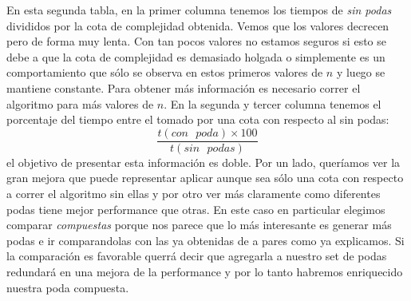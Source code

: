 En esta segunda tabla, en la primer columna tenemos los tiempos de \textit{sin podas} divididos por la cota
de complejidad obtenida. Vemos que los valores decrecen pero de forma muy lenta. Con tan pocos valores
no estamos seguros si esto se debe a que la cota de complejidad es demasiado holgada o simplemente es un comportamiento
que sólo se observa en estos primeros valores de $n$ y luego se mantiene constante. Para obtener más información es necesario
correr el algoritmo para más valores de $n$. En la segunda y tercer columna tenemos el porcentaje del tiempo entre el tomado
por una cota con respecto al sin podas:
\begin{displaymath}
  \frac{t(con\text{ }poda) \times 100}{t(sin\text{ }podas)}
\end{displaymath}
el objetivo de presentar esta información es doble. Por un lado, queríamos ver la gran mejora que puede representar
aplicar aunque sea sólo una cota con respecto a correr el algoritmo sin ellas y por otro ver más claramente como diferentes
podas tiene mejor performance que otras. En este caso en particular elegimos comparar \textit{compuestas} porque nos parece
que lo más interesante es generar más podas e ir comparandolas con las ya obtenidas de a pares como ya explicamos. Si 
la comparación es favorable querrá decir que agregarla a nuestro set de podas redundará en una mejora de la performance
y por lo tanto habremos enriquecido nuestra poda compuesta.
